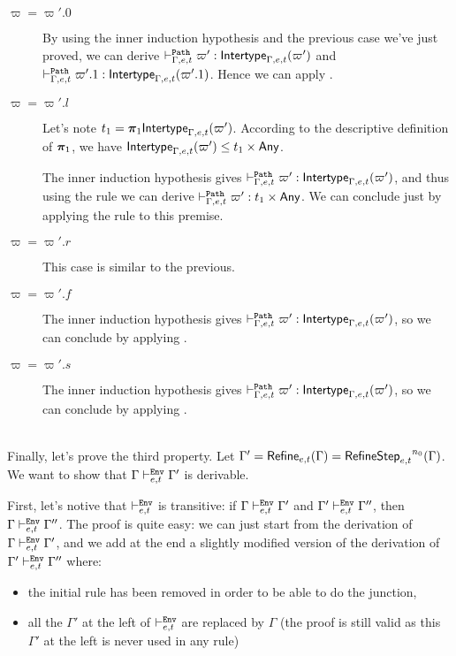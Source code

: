 \documentclass[a4paper]{article}
\theoremstyle{definition}
\begin{document}
\begin{description}
    \item[$\varpi=\varpi'.0$] By using the inner induction hypothesis and the previous case we've just proved, we can derive
    $\vdash^{\texttt{Path}}_{\Gamma,e,t} \varpi' : \textsf{Intertype}_{\Gamma,e,t} (\varpi')$ and $\vdash^{\texttt{Path}}_{\Gamma,e,t} \varpi'.1 : \textsf{Intertype}_{\Gamma,e,t} (\varpi'.1)$.
    Hence we can apply .
    \item[$\varpi=\varpi'.l$] Let's note $t_1=\boldsymbol{\pi}_1 \textsf{Intertype}_{\Gamma,e,t} (\varpi')$.
    According to the descriptive definition of $\boldsymbol{\pi}_1$, we have $\textsf{Intertype}_{\Gamma,e,t} (\varpi') \leq t_1\times \textsf{Any}$.

    The inner induction hypothesis gives $\vdash^{\texttt{Path}}_{\Gamma,e,t} \varpi' : \textsf{Intertype}_{\Gamma,e,t} (\varpi')$, and thus using the rule 
    we can derive $\vdash^{\texttt{Path}}_{\Gamma,e,t} \varpi' : t_1\times \textsf{Any}$. We can conclude just by applying the rule  to this premise.
    \item[$\varpi=\varpi'.r$] This case is similar to the previous.
    \item[$\varpi=\varpi'.f$] The inner induction hypothesis gives $\vdash^{\texttt{Path}}_{\Gamma,e,t} \varpi' : \textsf{Intertype}_{\Gamma,e,t} (\varpi')$,
    so we can conclude by applying .
    \item[$\varpi=\varpi'.s$] The inner induction hypothesis gives $\vdash^{\texttt{Path}}_{\Gamma,e,t} \varpi' : \textsf{Intertype}_{\Gamma,e,t} (\varpi')$,
    so we can conclude by applying .
  \end{description}\ \\

  Finally, let's prove the third property.
  Let $\Gamma' = \textsf{Refine}_{e,t}(\Gamma) = {\textsf{RefineStep}_{e,t}}^{n_0}(\Gamma)$.
  We want to show that $\Gamma \vdash^{\texttt{Env}}_{e,t} \Gamma'$ is derivable.

  First, let's notive that $\vdash^{\texttt{Env}}_{e,t}$ is transitive:
  if $\Gamma \vdash^{\texttt{Env}}_{e,t} \Gamma'$ and $\Gamma' \vdash^{\texttt{Env}}_{e,t} \Gamma''$, then $\Gamma \vdash^{\texttt{Env}}_{e,t} \Gamma''$.
  The proof is quite easy: we can just start from the derivation of $\Gamma \vdash^{\texttt{Env}}_{e,t} \Gamma'$, and we add
  at the end a slightly modified version of the derivation of $\Gamma' \vdash^{\texttt{Env}}_{e,t} \Gamma''$ where:
  \begin{itemize}
    \item the initial  rule has been removed in order to be able to do the junction,
    \item all the $\Gamma'$ at the left of $\vdash^{\texttt{Env}}_{e,t}$ are replaced by $\Gamma$
    (the proof is still valid as this $\Gamma'$ at the left is never used in any rule)
  \end{itemize}
\end{document}
